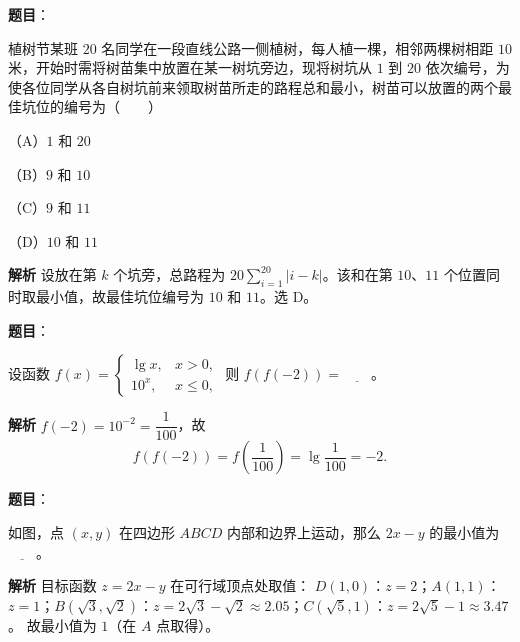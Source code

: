 \begin{answer}

\textbf{题目}：

植树节某班 $20$ 名同学在一段直线公路一侧植树，每人植一棵，相邻两棵树相距 $10$ 米，开始时需将树苗集中放置在某一树坑旁边，现将树坑从 $1$ 到 $20$ 依次编号，为使各位同学从各自树坑前来领取树苗所走的路程总和最小，树苗可以放置的两个最佳坑位的编号为\mbox{（　　）}

（A）$1$ 和 $20$

（B）$9$ 和 $10$

（C）$9$ 和 $11$

（D）$10$ 和 $11$

\textbf{解析}
设放在第 $k$ 个坑旁，总路程为 $20\displaystyle\sum_{i=1}^{20}|i-k|$。该和在第 $10$、$11$ 个位置同时取最小值，故最佳坑位编号为 $10$ 和 $11$。选 D。


\end{answer}
\begin{answer}

\textbf{题目}：

设函数 $f(x)=\begin{cases}\lg x,&x>0,\\10^x,&x\leqslant0,\end{cases}$ 则 $f(f(-2))=\underline{\qquad}$。

\textbf{解析}
$f(-2)=10^{-2}=\dfrac1{100}$，故
\nopagebreak[4]
\[f(f(-2))=f\left(\frac1{100}\right)=\lg\frac1{100}=-2.\]


\end{answer}
\begin{answer}

\textbf{题目}：

如图，点 $(x,y)$ 在四边形 $ABCD$ 内部和边界上运动，那么 $2x-y$ 的最小值为 $\underline{\qquad}$。
\nopagebreak[4]
\begin{center}\end{center}
\nopagebreak[4]
\textbf{解析}
目标函数 $z=2x-y$ 在可行域顶点处取值：
$D(1,0)$：$z=2$；$A(1,1)$：$z=1$；$B(\sqrt3,\sqrt2)$：$z=2\sqrt3-\sqrt2\approx2.05$；$C(\sqrt5,1)$：$z=2\sqrt5-1\approx3.47$。
故最小值为 $1$（在 $A$ 点取得）。


\end{answer}
